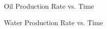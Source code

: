 \documentclass[12pt,letterpaper,titlepage]{article}
\begin{document}
\begin{figure}[p]
\centering
{}
\caption{\label{qo}Oil Production Rate vs. Time}
\end{figure}
\begin{figure}[p]
\centering
{}
\caption{\label{qw}Water Production Rate vs. Time}
\end{figure}
\end{document}
